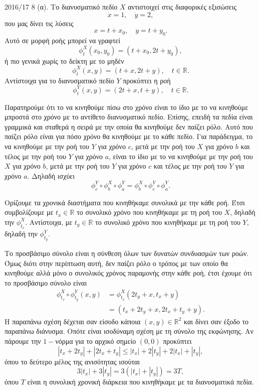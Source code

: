 \begin{solution}{2016/17 8}
    (α). Το διανυσματικό πεδίο \( X \) αντιστοιχεί στις διαφορικές εξισώσεις
    \[
        \dot{x} = 1, \quad \dot{y} = 2,
    \]
    που μας δίνει τις λύσεις
    \[
        x = t + x_0, \quad y = t + y_0.
    \]
    Αυτό σε μορφή ροής μπορεί να γραφτεί
    \[
        \phi^X_t(x_0, y_0) = (t + x_0, 2t + y_0),
    \]
    ή πιο γενικά χωρίς το δείκτη με το μηδέν
    \[
        \phi^X_t(x, y) = (t + x, 2t + y), \quad t \in \mathbb{R}.
    \]
    Αντίστοιχα για το διανυσματικό πεδίο \( Y \) προκύπτει η ροή
    \[
        \phi^Y_t(x, y) = (2t + x, t + y), \quad t \in \mathbb{R}.
    \]

    Παρατηρούμε ότι το να κινηθούμε πίσω στο χρόνο είναι το ίδιο με το να
    κινηθούμε μπροστά στο χρόνο με το αντίθετο διανυσματικό πεδίο. Επίσης,
    επειδή τα πεδία είναι γραμμικά και σταθερά η σειρά με την οποία θα κινηθούμε
    δεν παίζει ρόλο. Αυτό που παίζει ρόλο είναι για πόσο χρόνο θα κινηθούμε με το
    κάθε πεδίο. Για παράδειγμα, το να κινηθούμε με την ροή του \( Y \) για χρόνο
    \( c \), μετά με την ροή του \( X \) για χρόνο \( b \) και τέλος με την
    ροή του \( Y \) για χρόνο \( a \), είναι το ίδιο με το να κινηθούμε με την
    ροή του \( X \) για χρόνο \( b \), μετά με την ροή του \( Y \) για χρόνο
    \( c \) και τέλος με την ροή του \( Y \) για χρόνο \( a \). Δηλαδή
    ισχύει
    \[
        \phi^Y_{c} \circ \phi^X_{b} \circ \phi^Y_{a} =
        \phi^X_{b} \circ \phi^Y_{c} \circ \phi^Y_{a}.
    \]

    Ορίζουμε τα χρονικά διαστήματα που κινηθήκαμε συνολικά με την κάθε ροή.
    Έτσι συμβολίζουμε με \( t_x \in \mathbb{R} \) το συνολικό χρόνο που
    κινηθήκαμε με τη ροή του \( X \), δηλαδή την \( \phi^{X}_{t_x} \).
    Αντίστοιχα, με \( t_y \in \mathbb{R} \) το συνολικό χρόνο που κινηθήκαμε
    με τη ροή του \( Y \), δηλαδή την \( \phi^{Y}_{t_y} \).

    Το προσβάσιμο σύνολο είναι η σύνθεση όλων των δυνατών συνδυασμών των ροών.
    Όμως διότι στην περίπτωση αυτή, δεν παίζει ρόλο ο τρόπος με των οποίο θα
    κινηθούμε αλλά μόνο ο συνολικός χρόνος παραμονής στην κάθε ροή, έτσι έχουμε
    ότι το προσβάσιμο σύνολο είναι
    \begin{align}\label{eq:ex8_flow}
        \phi^X_{t_x} \circ \phi^Y_{t_y} (x, y) &=
        \phi^X_{t_x} (2t_y + x, t_x + y) \\
        &= (t_x + 2t_y + x, 2t_x + t_y + y).
    \end{align}
    Η παραπάνω σχέση δέχεται σαν είσοδο κάποια \( (x, y) \in \mathbb{R}^2 \) και
    δίνει σαν έξοδο το παραπάνω διάνυσμα. Οπότε είναι ισοδύναμη σχέση με τη
    σύνολο της εκφώνησης. Αν πάρουμε την \(1-\)νόρμα για το αρχικό σημείο
    \( (0, 0) \) προκύπτει
    \[
        |t_x + 2t_y| + |2t_x + t_y| \leq |t_x| + 2|t_y|  + 2|t_x| + |t_y|,
    \]
    όπου το δεύτερο μέλος της ανισότητας ισούται
    \[
        3|t_x| + 3|t_y| = 3(|t_x| + |t_y|) = 3T,
    \]
    όπου \( T \) είναι η συνολική χρονική διάρκεια που κινηθήκαμε με τα διανυσματικά πεδία.


\end{solution}
